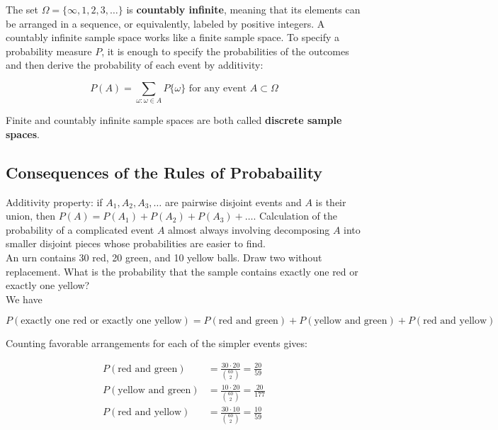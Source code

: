         The set $\Omega = \{\infty, 1, 2, 3, \dots\}$ is \textbf{countably infinite}, meaning that its elements can be arranged in a sequence, or equivalently, labeled by positive integers. A countably infinite sample
        space works like a finite sample space. To specify a probability measure $P$, it is enough to specify the probabilities of the outcomes and then derive the probability of each event by additivity:

        \[
            P(A) = \sum_{\omega: \omega \in A} P\{\omega\} \text{ for any event }A \subset \Omega
        \]

        Finite and countably infinite sample spaces are both called \textbf{discrete sample spaces}.

    \subsection{Consequences of the Rules of Probabaility}  %

        Additivity property: if $A_1, A_2, A_3, \dots$ are pairwise disjoint events and $A$ is their union, then $P(A) = P(A_1) + P(A_2) + P(A_3) + \dots$. Calculation of the probability of a complicated event $A$ almost
        always involving decomposing $A$ into smaller disjoint pieces whose probabilities are easier to find. \\

        \textit{} An urn contains 30 red, 20 green, and 10 yellow balls. Draw two without replacement. What is the probability that the sample contains exactly one red or exactly one yellow? \\

        We have

        \[
            P(\text{exactly one red or exactly one yellow}) = P(\text{red and green}) + P(\text{yellow and green}) + P(\text{red and yellow})
        \]

        Counting favorable arrangements for each of the simpler events gives:

        \begin{align*}
            P(\text{red and green}) &= \frac{30\cdot 20}{\binom{60}{2}} = \frac{20}{59} \\
            P(\text{yellow and green}) &= \frac{10\cdot 20}{\binom{60}{2}} = \frac{20}{177} \\
            P(\text{red and yellow}) &= \frac{30\cdot 10}{\binom{60}{2}} = \frac{10}{59}
        \end{align*}

